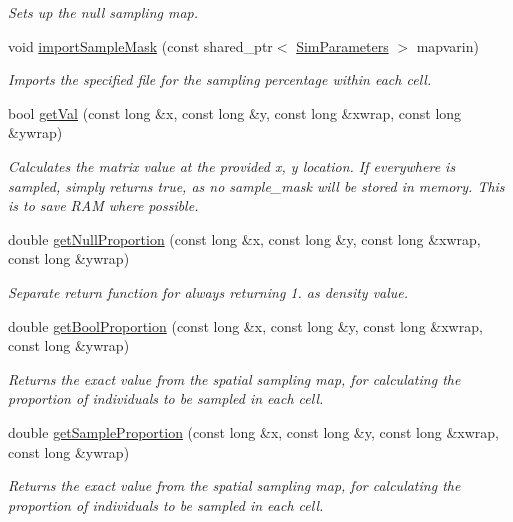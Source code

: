 \begin{DoxyCompactItemize}
\begin{DoxyCompactList}\small\item\em Sets up the null sampling map. \end{DoxyCompactList}\item 
void \hyperlink{class_data_mask_af638b08c5f7b822e0401210d605de3d1}{import\+Sample\+Mask} (const shared\+\_\+ptr$<$ \hyperlink{struct_sim_parameters}{Sim\+Parameters} $>$ mapvarin)
\begin{DoxyCompactList}\small\item\em Imports the specified file for the sampling percentage within each cell. \end{DoxyCompactList}\item 
bool \hyperlink{class_data_mask_ace6578db5b096b0c24112cc438cfa90d}{get\+Val} (const long \&x, const long \&y, const long \&xwrap, const long \&ywrap)
\begin{DoxyCompactList}\small\item\em Calculates the matrix value at the provided x, y location. If everywhere is sampled, simply returns true, as no sample\+\_\+mask will be stored in memory. This is to save R\+AM where possible. \end{DoxyCompactList}\item 
double \hyperlink{class_data_mask_af7a7cb35d309d37f42c7a3720a02b400}{get\+Null\+Proportion} (const long \&x, const long \&y, const long \&xwrap, const long \&ywrap)
\begin{DoxyCompactList}\small\item\em Separate return function for always returning 1. as density value. \end{DoxyCompactList}\item 
double \hyperlink{class_data_mask_a31cb42c363219967a7867340a7110e9f}{get\+Bool\+Proportion} (const long \&x, const long \&y, const long \&xwrap, const long \&ywrap)
\begin{DoxyCompactList}\small\item\em Returns the exact value from the spatial sampling map, for calculating the proportion of individuals to be sampled in each cell. \end{DoxyCompactList}\item 
double \hyperlink{class_data_mask_a682324892b67910b1dd2fa86a98c0873}{get\+Sample\+Proportion} (const long \&x, const long \&y, const long \&xwrap, const long \&ywrap)
\begin{DoxyCompactList}\small\item\em Returns the exact value from the spatial sampling map, for calculating the proportion of individuals to be sampled in each cell. \end{DoxyCompactList}\item 

\end{DoxyCompactItemize}

